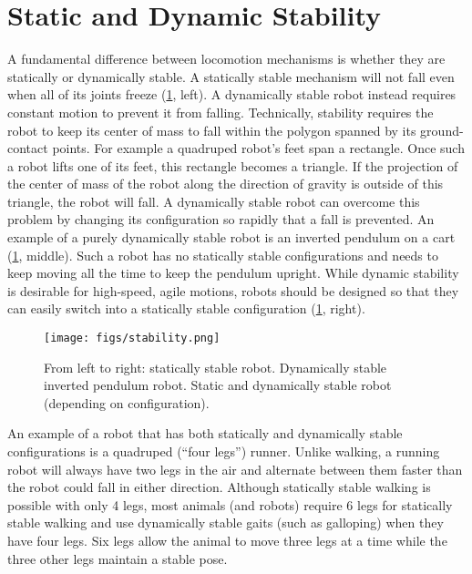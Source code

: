 
\section{Static and Dynamic Stability}\label{sec:stability}
A fundamental difference between locomotion mechanisms is whether they are statically or dynamically stable. A statically stable mechanism will not fall even when all of its joints freeze (\cref{fig:stability}, left). A dynamically stable robot instead requires constant motion to prevent it from falling. Technically, stability requires the robot to keep its center of mass to fall within the polygon spanned by its ground-contact points. For example a quadruped robot's feet span a rectangle. Once such a robot lifts one of its feet, this rectangle becomes a triangle. If the projection of the center of mass of the robot along the direction of gravity is outside of this triangle, the robot will fall. A dynamically stable robot can overcome this problem by changing its configuration so rapidly that a fall is prevented. An example of a purely dynamically stable robot is an inverted pendulum on a cart  (\cref{fig:stability}, middle). Such a robot has no statically stable configurations and needs to keep moving all the time to keep the pendulum upright. While dynamic stability is desirable for high-speed, agile motions, robots should be designed so that they can easily switch into a statically stable configuration (\cref{fig:stability}, right).

\begin{figure}
	\centering
		\texttt{[image: figs/stability.png]}
	\caption{From left to right: statically stable robot. Dynamically stable inverted pendulum robot. Static and dynamically stable robot (depending on configuration).}
	\label{fig:stability}
\end{figure}

An example of a robot that has both statically and dynamically stable configurations is a quadruped (``four legs'') runner. Unlike walking, a running robot will always have two legs in the air and alternate between them faster than the robot could fall in either direction. Although statically stable walking is possible with only 4 legs, most animals (and robots) require 6 legs for statically stable walking and use dynamically stable gaits (such as galloping) when they have four legs. Six legs allow the animal to move three legs at a time while the three other legs maintain a stable pose.


